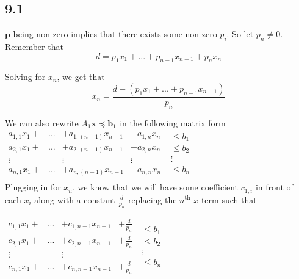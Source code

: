 \documentclass[letterpaper,12pt]{article}
\theoremstyle{definition}
\begin{document}
\subsection*{9.1}




$\mathbf{p}$ being non-zero implies that there exists some non-zero $p_i$. So let $p_n \neq 0$. Remember that \[d = p_1x_1 + ...+ p_{n-1}x_{n-1} + p_nx_n\]

Solving for $x_n$, we get that\[x_n = \frac{d - ( p_1x_1 + ...+ p_{n-1}x_{n-1} )}{p_n}\]


\noindent We can also rewrite $A_1 \mathbf{x} \preceq \mathbf{b_1}$ in the following matrix form \\

$\begin{matrix}
a_{1,1}x_1 +& ...&+a_{1,(n-1)}x_{n-1} &+ a_{1,n}x_{n} \\
a_{2,1}x_1 +& ...&+a_{2,(n-1)}x_{n-1} &+ a_{2,n}x_{n} \\
\vdots & &\vdots &\vdots    \\
a_{n,1}x_1 +& ...&+ a_{n,(n-1)}x_{n-1} &+ a_{n,n}x_{n} \\
\end{matrix}$
$\begin{matrix}
\leq b_1\\
\leq b_2\\
\vdots\\
\leq b_{n}\\
\end{matrix}$\\

Plugging in for $x_n$, we know that we will have some coefficient $c_{1,i}$ in front of each $x_i$ along with a constant $\frac{d}{p_n}$ replacing the $n^{\text{th}}$ $x$ term such that

$\begin{matrix}
    c_{1,1} x_1 + &...& + c_{1,n-1} x_{n-1} & + \frac{d}{p_n} \\
    c_{2,1} x_1 + &...& + c_{2,n-1} x_{n-1} & + \frac{d}{p_n} \\
    \vdots &  &\vdots    \\
    c_{n,1} x_1 + &...& + c_{n,n-1} x_{n-1} & + \frac{d}{p_n} \\
\end{matrix}$
$\begin{matrix}
\leq b_1\\
\leq b_2\\
\vdots\\
\leq b_{n}\\
\end{matrix}$\\
\end{document}

